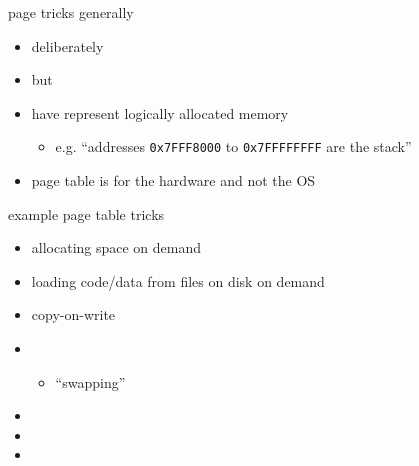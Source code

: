 \begin{frame}{page tricks generally}
\begin{itemize}
\item deliberately 
\item but 
\vspace{.5cm}
\item have  represent logically allocated memory
    \begin{itemize}
    \item e.g. ``addresses {\tt 0x7FFF8000} to {\tt 0x7FFFFFFFF} are the stack''
    \end{itemize}
\item page table is for the hardware and not the OS
\end{itemize}
\end{frame}

\begin{frame}{example page table tricks}
    \begin{itemize}
    \item allocating space on demand
    \item loading code/data from files on disk on demand
    \item copy-on-write
    \item {}
        \begin{itemize}
        \item ``swapping''
        \end{itemize}
    \item {}
    \item {}
    \item {}
    \end{itemize}
\end{frame}

